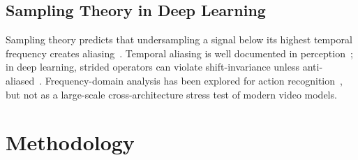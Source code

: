 \documentclass[runningheads]{llncs}
\begin{document}
\subsection{Sampling Theory in Deep Learning}

Sampling theory predicts that undersampling a signal below its highest temporal frequency creates aliasing~\cite{shannon1949communication}. Temporal aliasing is well documented in perception~\cite{vanrullen2007wagon}; in deep learning, strided operators can violate shift-invariance unless anti-aliased~\cite{zhang2019antialiased}. Frequency-domain analysis has been explored for action recognition~\cite{tran2014frequency}, but not as a large-scale cross-architecture stress test of modern video models.

\section{Methodology}
\label{sec:method}
\end{document}
